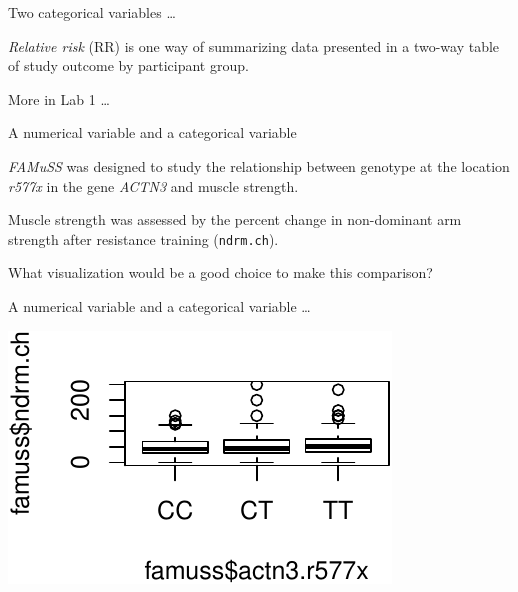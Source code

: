 \documentclass[
  ignorenonframetext,
]{beamer}
\newenvironment{Shaded}{\begin{snugshade}}{\end{snugshade}}
\newcommand{\KeywordTok}[1]{\textcolor[rgb]{0.13,0.29,0.53}{\textbf{#1}}}
\newcommand{\NormalTok}[1]{#1}
\newcommand{\OperatorTok}[1]{\textcolor[rgb]{0.81,0.36,0.00}{\textbf{#1}}}
\newcommand{\StringTok}[1]{\textcolor[rgb]{0.31,0.60,0.02}{#1}}
\begin{document}
\begin{frame}{Two categorical variables \dots}
\protect\hypertarget{two-categorical-variables-4}{}

\emph{Relative risk} (RR) is one way of summarizing data presented in a
two-way table of study outcome by participant group.

More in Lab 1 \dots

\end{frame}

\begin{frame}{A numerical variable and a categorical variable}
\protect\hypertarget{a-numerical-variable-and-a-categorical-variable}{}

\emph{FAMuSS} was designed to study the relationship between genotype at
the location \emph{r577x} in the gene \emph{ACTN3} and muscle strength.

Muscle strength was assessed by the percent change in non-dominant arm
strength after resistance training (\texttt{ndrm.ch}).

What visualization would be a good choice to make this comparison?

\end{frame}

\begin{frame}[fragile]{A numerical variable and a categorical variable
\dots}
\protect\hypertarget{a-numerical-variable-and-a-categorical-variable-1}{}

\scriptsize

\scriptsize

\begin{Shaded}
\end{Shaded}

\begin{center}\includegraphics[width=1\linewidth]{001-exploring-data_files/figure-beamer/ndrmbox-1} \end{center}

\normalsize

\end{frame}
\end{document}
